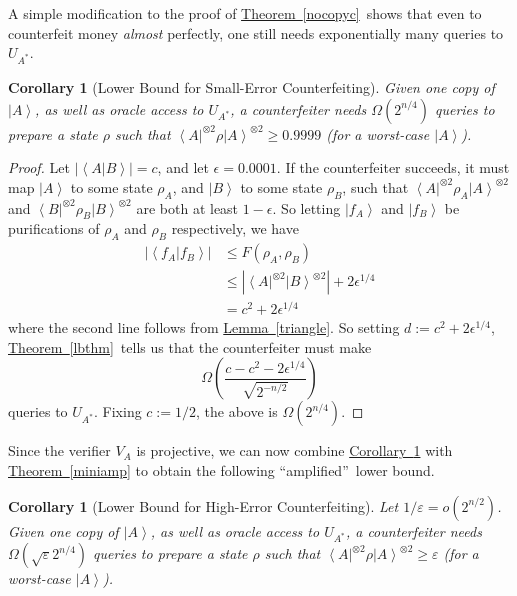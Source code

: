 \documentclass[10pt]{article}
\newtheorem{corollary}[theorem]{Corollary}
\theoremstyle{definition}
\numberwithin{equation}{section}
\newcommand{\expref}[2]{\texorpdfstring{\hyperref[#2]{#1~\ref{#2}}}{#1~\ref{#2}}}
\begin{document}
A simple modification to the proof of \expref{Theorem}{nocopyc}\ shows that even
to counterfeit money \emph{almost} perfectly, one still needs exponentially
many queries to $U_{A^{\ast}}$.

\begin{corollary}
[Lower Bound for Small-Error Counterfeiting]\label{smallerrror}Given one copy
of $\left\vert A\right\rangle $, as well as oracle access to $U_{A^{\ast}}$, a
counterfeiter needs $\Omega(  2^{n/4})  $ queries to prepare a
state $\rho$ such that $\left\langle A\right\vert ^{\otimes2}\rho\left\vert
A\right\rangle ^{\otimes2}\geq0.9999$ (for a worst-case $\left\vert
A\right\rangle $).
\end{corollary}

\begin{proof}
Let $\left\vert \left\langle A|B\right\rangle \right\vert =c$, and let
$\epsilon=0.0001$. If the counterfeiter succeeds, it must map $\left\vert
A\right\rangle $ to some state $\rho_{A}$, and $\left\vert B\right\rangle
$ to some state $\rho_{B}$, such that $\left\langle A\right\vert ^{\otimes
2}\rho_{A}\left\vert A\right\rangle ^{\otimes2}$ and $\left\langle
B\right\vert ^{\otimes2}\rho_{B}\left\vert B\right\rangle ^{\otimes2}$ are
both at least $1-\epsilon$. So letting $\left\vert f_{A}\right\rangle $ and
$\left\vert f_{B}\right\rangle $ be purifications of $\rho_{A}$ and
$\rho_{B}$ respectively, we have%
\begin{align*}
\left\vert \left\langle f_{A}|f_{B}\right\rangle \right\vert  &  \leq F\left(
\rho_{A},\rho_{B}\right)  \\
&  \leq\left\vert \left\langle A\right\vert ^{\otimes2}\left\vert
B\right\rangle ^{\otimes2}\right\vert +2\epsilon^{1/4}\\
&  =c^{2}+2\epsilon^{1/4}%
\end{align*}
where the second line follows from \expref{Lemma}{triangle}. So setting
$d:=c^{2}+2\epsilon^{1/4}$, \expref{Theorem}{lbthm}\ tells us that the
counterfeiter must make%
\[
\Omega\left(  \frac{c-c^{2}-2\epsilon^{1/4}}{\sqrt{2^{-n/2}}}\right)
\]
queries to $U_{A^{\ast}}$. Fixing $c:=1/2$, the above is $\Omega\left(
2^{n/4}\right)  $.
\end{proof}

Since the verifier $V_{A}$ is projective, we can now combine \expref{Corollary}{smallerrror} with \expref{Theorem}{miniamp} to obtain the following
\textquotedblleft amplified\textquotedblright\ lower bound.

\begin{corollary}
[Lower Bound for High-Error Counterfeiting]\label{largeerrror}Let
$1/\varepsilon=o\left(  2^{n/2}\right)  $. Given one copy of $\left\vert
A\right\rangle $, as well as oracle access to $U_{A^{\ast}}$, a counterfeiter
needs $\Omega\left(  \sqrt{\varepsilon}2^{n/4}\right)  $ queries to prepare a
state $\rho$ such that $\left\langle A\right\vert ^{\otimes2}\rho\left\vert
A\right\rangle ^{\otimes2}\geq\varepsilon$ (for a worst-case $\left\vert
A\right\rangle $).
\end{corollary}
\end{document}
